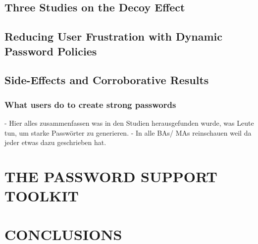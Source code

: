 \documentclass[12pt,a4paper]{book}
\begin{document}
\chapter{Three Studies on the Decoy Effect}
\chapter{Reducing User Frustration with Dynamic Password Policies}

\chapter{Side-Effects and Corroborative Results}
\section{What users do to create strong passwords}
- Hier alles zusammenfassen was in den Studien herausgefunden wurde, 
was Leute tun, um starke Passwörter zu generieren. 
- In alle BAs/ MAs reinschauen weil da jeder etwas dazu geschrieben hat. 

\part{THE PASSWORD SUPPORT TOOLKIT}




\part{CONCLUSIONS}



\cleardoublepage


\backmatter




%



\cleardoublepage
{}
\end{document}

